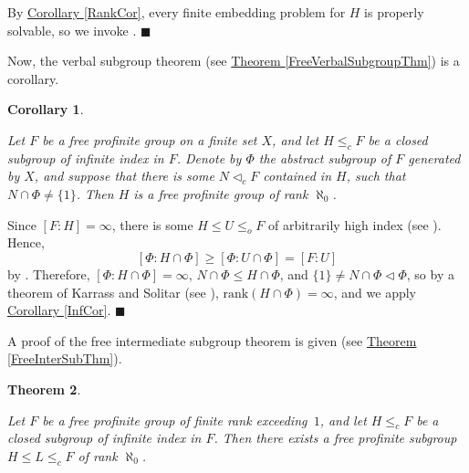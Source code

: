 \documentclass[12pt,a4paper]{article}
\newtheorem{theorem}{Theorem}[section]
\newtheorem{corollary}[theorem]{Corollary}
\newenvironment{proof}[1][Proof]{\begin{trivlist}
\item[\hskip \labelsep {\bfseries #1}]}{\end{trivlist}}
\newcommand{\thmref}[1]{\hyperref[#1]{Theorem \ref*{#1}}}
\newcommand{\corref}[1]{\hyperref[#1]{Corollary \ref*{#1}}}
\newcommand{\rank}{\text{rank}}
\begin{document}
\begin{proof}

By \corref{RankCor}, every finite embedding problem for $H$ is properly solvable, so we invoke \cite[Corollary 24.8.3]{FJ}. $\blacksquare$

\end{proof}

Now, the verbal subgroup theorem (see \thmref{FreeVerbalSubgroupThm}) is a corollary.

\begin{corollary} \label{ContWordCor}

Let $F$ be a free profinite group on a finite set $X$, and let $H \leq_c F$ be a closed subgroup of infinite index in $F$. Denote by $\Phi$ the abstract subgroup of $F$ generated by $X$, and suppose that there is some $N \lhd_c F$ contained in $H$, such that $N \cap \Phi \neq \{1\}$. Then $H$ is a free profinite group of rank $\aleph_0$.

\end{corollary} 

\begin{proof}

Since $[F : H] = \infty$, there is some $H \leq U \leq_o F$ of arbitrarily high index (see \cite[Proposition 2.1.4 (d)]{RZ}). Hence, $$[\Phi : H \cap \Phi] \geq [\Phi : U \cap \Phi] = [F : U]$$ by \cite[Proposition 3.2.2 (a),(d)]{RZ}. Therefore, $[\Phi : H \cap \Phi] = \infty$, $N \cap \Phi \leq H \cap \Phi$, and $\{1\} \neq N \cap \Phi \lhd \Phi$, so by a theorem of Karrass and Solitar (see \cite{KS}), $\rank(H \cap \Phi) = \infty$, and we apply \corref{InfCor}. $\blacksquare$

\end{proof}

A proof of the free intermediate subgroup theorem is given (see \thmref{FreeInterSubThm}).

\begin{theorem} \label{RouteThm}

Let $F$ be a free profinite group of finite rank \mbox{exceeding $1$,} and let $H \leq_c F$ be a closed subgroup of infinite index in $F$. Then there exists a free profinite subgroup $H \leq L \leq_c F$ of rank $\aleph_0$.

\end{theorem}
\end{document}
